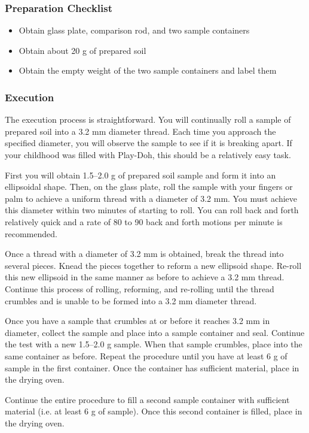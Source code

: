 \documentclass[12pt]{article}
\begin{document}
\subsubsection*{Preparation Checklist}
\begin{itemize}
    \item Obtain glass plate, comparison rod, and two sample containers
    \item Obtain about 20 g of prepared soil
    \item Obtain the empty weight of the two sample containers and label them
\end{itemize}

\subsubsection{Execution}
The execution process is straightforward. You will continually roll a sample of prepared soil into a 3.2 mm diameter thread. Each time you approach the specified diameter, you will observe the sample to see if it is breaking apart. If your childhood was filled with Play-Doh\textregistered{}, this should be a relatively easy task.

First you will obtain 1.5--2.0 g of prepared soil sample and form it into an ellipsoidal shape. Then, on the glass plate, roll the sample with your fingers or palm to achieve a uniform thread with a diameter of 3.2 mm. You must achieve this diameter within two minutes of starting to roll. You can roll back and forth relatively quick and a rate of 80 to 90 back and forth motions per minute is recommended.

Once a thread with a diameter of 3.2 mm is obtained, break the thread into several pieces. Knead the pieces together to reform a new ellipsoid shape. Re-roll this new ellipsoid in the same manner as before to achieve a 3.2 mm thread. Continue this process of rolling, reforming, and re-rolling until the thread crumbles and is unable to be formed into a 3.2 mm diameter thread.

Once you have a sample that crumbles at or before it reaches 3.2 mm in diameter, collect the sample and place into a sample container and seal. Continue the test with a new 1.5--2.0 g sample. When that sample crumbles, place into the same container as before. Repeat the procedure until you have at least 6 g of sample in the first container. Once the container has sufficient material, place in the drying oven.

Continue the entire procedure to fill a second sample container with sufficient material (i.e. at least 6 g of sample). Once this second container is filled, place in the drying oven.
\end{document}
